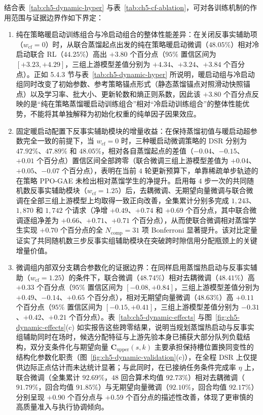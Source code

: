 结合表~\ref{tab:ch5-dynamic-hyper} 与表~\ref{tab:ch5-cf-ablation}，可对各训练机制的作用范围与证据边界作如下界定：

\begin{enumerate}
\item 纯在策略暖启动训练组合与冷启动组合的整体性能差异：在关闭反事实辅助项（$w_{\mathrm{cf}}=0$）时，从联合蒸馏起点出发的纯在策略暖启动微调（$48.05\%$）相对冷启动联合 RL（$44.25\%$）高出 $+3.80$ 个百分点（$95\%$ 置信区间为 $[+3.23,+4.29]$，三组上游模型差值分别为 $+4.34$、$+3.24$、$+3.84$ 个百分点）。正如 5.4.3 节与表~\ref{tab:ch5-dynamic-hyper} 所说明，暖启动组与冷启动组同时改变了初始参数、参考策略锚点形式（静态蒸馏锚点对照滑动快照锚点）以及学习率、批大小、更新轮数和熵正则系数，因此该 $+3.80$ 个百分点反映的是“纯在策略蒸馏暖启动训练组合”相对“冷启动训练组合”的整体性能优势，不能将其单独解释为初始化权重的纯单因子因果效应。

\item 固定暖启动配置下反事实辅助模块的增量收益：在保持蒸馏初值与暖启动超参数完全一致的前提下，当 $w_{\mathrm{cf}}=0$ 时，三种暖启动微调策略的 DSR 分别为 $47.92\%$、$47.89\%$ 和 $48.05\%$，相对各自蒸馏起点的差值（$-0.04$、$-0.15$、$+0.01$ 个百分点）置信区间全部跨零（联合微调三组上游模型差值为 $+0.04$、$+0.05$、$-0.07$ 个百分点），表明在当前 $4$ 轮更新预算下，单靠稀疏单步轨迹的在策略 PPO-GAE 未检出相对蒸馏学生的净提升。启用每 $4$ 步一次的共同随机数反事实辅助模块（$w_{\mathrm{cf}}=1.25$）后，去耦微调、无期望向量微调与联合微调在全部三组上游模型上均取得一致正向改善，全集累计分别多完成 $1{,}243$、$1{,}870$ 和 $1{,}742$ 个请求（净增 $+0.49$、$+0.74$ 和 $+0.69$ 个百分点，其中联合微调逐组净差为 $+0.66$、$+0.71$、$+0.71$ 个百分点），从而使联合微调相对蒸馏学生实现 $+0.70$ 个百分点的全 $N_{\mathrm{comp}}=31$ 项 Bonferroni 显著提升。该对比定量证实了共同随机数三步反事实组辅助模块在突破跨时隙信用分配瓶颈上的关键增量价值。

\item 微调组内部双分支耦合参数化的证据边界：在同样启用蒸馏热启动与反事实辅助（$w_{\mathrm{cf}}=1.25$）的条件下，联合微调（$48.74\%$）相对去耦微调（$48.41\%$）高 $+0.33$ 个百分点（$95\%$ 置信区间为 $[-0.08,+0.84]$，三组上游模型差值分别为 $+0.49$、$-0.14$、$+0.65$ 个百分点），相对无期望向量微调（$48.63\%$）高 $+0.11$ 个百分点（$95\%$ 置信区间为 $[-0.15,+0.41]$，三组上游模型差值分别为 $-0.31$、$+0.42$、$+0.21$ 个百分点）。表~\ref{tab:ch5-dynamic-effects} 与图~\ref{fig:ch5-dynamic-effects}(c) 如实报告这些跨零结果，说明当规划蒸馏热启动与反事实组辅助同时在场时，候选分配特征与上游先验本身已捕获大部分队列负载结构，双分支条件化与期望向量 $\mathbf{C}_{\mathrm{upper}}(s,k)$ 主要承担保持槽位置换同变性的结构化参数化职责（图~\ref{fig:ch5-dynamic-validation}(c)），在全程 DSR 上仅提供边际正点估计而未达统计显著；与此同时，在已接纳任务条件完成率 $\eta$ 上，联合微调（全集累计 $92.69\%$，$48$ 回合算术均值 $92.73\%$）相对去耦微调（$91.79\%$，回合均值 $91.85\%$）与无期望向量微调（$92.10\%$，回合均值 $92.17\%$）分别呈现 $+0.90$ 个百分点与 $+0.59$ 个百分点的描述性改善，体现了更审慎的高质量准入与执行协调倾向。
\end{enumerate}

